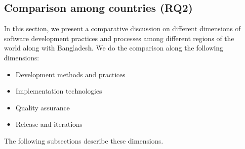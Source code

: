 \subsection{Comparison among countries (RQ2)}
\label{RQ2}

In this section, we present a comparative discussion on different dimensions of software development practices and processes among different regions of the world along with Bangladesh. We do the comparison along the following dimensions:

\begin{itemize}
    \item Development methods and practices
    \item Implementation technologies
    \item Quality assurance
    \item Release and iterations
\end{itemize}

The following subsections describe these dimensions.






